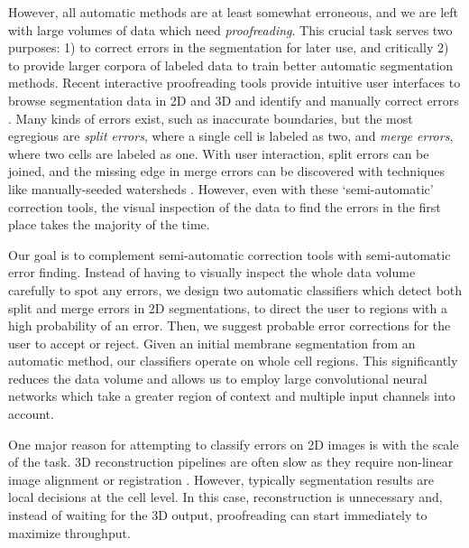 However, all automatic methods are at least somewhat erroneous, and we are left with large volumes of data which need \emph{proofreading}. This crucial task serves two purposes: 1) to correct errors in the segmentation for later use, and critically 2) to provide larger corpora of labeled data to train better automatic segmentation methods. Recent interactive proofreading tools provide intuitive user interfaces to browse segmentation data in 2D and 3D and identify and manually correct errors \cite{markus_proofreading,raveler,mojo2,haehn_dojo_2014}. Many kinds of errors exist, such as inaccurate boundaries, but the most egregious are \emph{split errors}, where a single cell is labeled as two, and \emph{merge errors}, where two cells are labeled as one. With user interaction, split errors can be joined, and the missing edge in merge errors can be discovered with techniques like manually-seeded watersheds \cite{haehn_dojo_2014}. However, even with these `semi-automatic' correction tools, the visual inspection of the data to find the errors in the first place takes the majority of the time.

Our goal is to complement semi-automatic correction tools with semi-automatic error finding. Instead of having to visually inspect the whole data volume carefully to spot any errors, we design two automatic classifiers which detect both split and merge errors in 2D segmentations, to direct the user to regions with a high probability of an error. Then, we suggest probable error corrections for the user to accept or reject. Given an initial membrane segmentation from an automatic method, our classifiers operate on whole cell regions. This significantly reduces the data volume and allows us to employ large convolutional neural networks which take a greater region of context and multiple input channels into account.

One major reason for attempting to classify errors on 2D images is with the scale of the task. 3D reconstruction pipelines are often slow as they require non-linear image alignment or registration \cite{akselrod09,beyer13,Saalfeld2010Asrigidaspossible}. However, typically segmentation results are local decisions at the cell level. In this case, reconstruction is unnecessary and, instead of waiting for the 3D output, proofreading can start immediately to maximize throughput.


